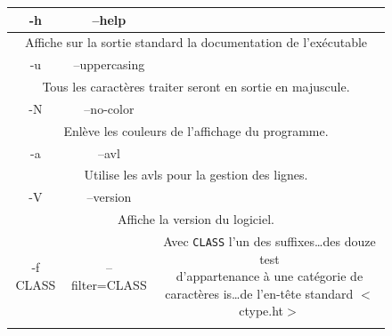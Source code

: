 \documentclass[12pt]{article}
\begin{document}
    \begin{figure}[H]  
         
        \centering
        \begin{tabular}{|c|c|c|}
            \hline
                \cellcolor{blue-s!25} -h & \cellcolor{blue-s!25} --help  &
                \cellcolor{blue-t!70}\\
            \hline
                \multicolumn{3}{|c|}{\cellcolor{blue-u!7}Affiche sur la sortie 
                standard la documentation de l'exécutable}\\
            \hline
                \cellcolor{blue-s!25} -u  & \cellcolor{blue-s!25} --uppercasing 
                & \cellcolor{blue-t!70} \\
            \hline
                \multicolumn{3}{|c|}{\cellcolor{blue-u!7}Tous les caractères 
                traiter seront en sortie en majuscule.}\\
            \hline 
                \cellcolor{blue-s!25} -N & \cellcolor{blue-s!25} --no-color  & 
                \cellcolor{blue-t!70} \\
            \hline
                \multicolumn{3}{|c|}{\cellcolor{blue-u!7}Enlève les couleurs de 
                l'affichage du programme.}\\
            \hline
                \cellcolor{blue-s!25} -a & \cellcolor{blue-s!25} --avl & 
                \cellcolor{blue-t!70} \\
            \hline
                \multicolumn{3}{|c|}{\cellcolor{blue-u!7}Utilise les avls pour 
                la gestion des lignes.}\\
            \hline
                \cellcolor{blue-s!25} -V & \cellcolor{blue-s!25} --version & 
                \cellcolor{blue-t!70} \\
            \hline
                \multicolumn{3}{|c|}{\cellcolor{blue-u!7}Affiche la version du  
                logiciel.}\\
            \hline
                \cellcolor{blue-s!25} -f CLASS & \cellcolor{blue-s!25} 
                --filter=CLASS & \rule{0pt}{2.6em}\cellcolor{blue-s!25}
                {\parbox{9cm}{ Avec \texttt{CLASS} l’un des 
                suffixes\ldots des douze test\\ d’appartenance à une catégorie 
                de caractères is\ldots de l’en-tête standard $<$ctype.ht$>$}} \\
                [1.3em]
            \hline
                \multicolumn{3}{|c|}{\cellcolor{blue-u!7}\rule{0pt}{2em}
}
\end{tabular}
\end{figure}
\end{document}
